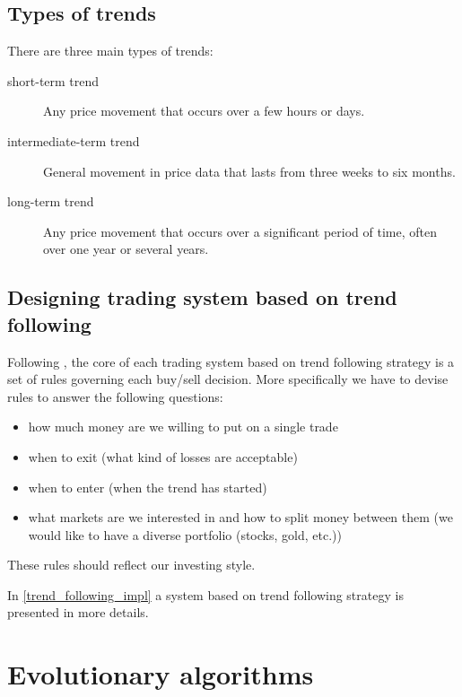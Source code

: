\subsection{Types of trends}
\label{sec:types_of_trends}

There are three main types of trends:

\begin{description}
  \item [short-term trend]
      Any price movement that occurs over a few hours or days.
  \item [intermediate-term trend]
      General movement in price data that lasts from three weeks to six months.
  \item [long-term trend]
      Any price movement that occurs over a significant period of time, often over one year or several years.
\end{description}



\subsection{Designing trading system based on trend following} 

Following \cite{Trend01}, the core of each trading system based on trend following strategy is a set of rules governing each buy/sell decision.
More specifically we have to devise rules to answer the following questions:

\begin{itemize}
  \item how much money are we willing to put on a single trade
  \item when to exit (what kind of losses are acceptable)
  \item when to enter (when the trend has started) 
  \item what markets are we interested in and how to split money between them (we would like to have a diverse portfolio (stocks, gold, etc.))
\end{itemize}

These rules should reflect our investing style.

In \ref{trend_following_impl} a system based on trend following strategy is presented in more details.


\section{Evolutionary algorithms}
\label{sec:evolAlgorithms}

